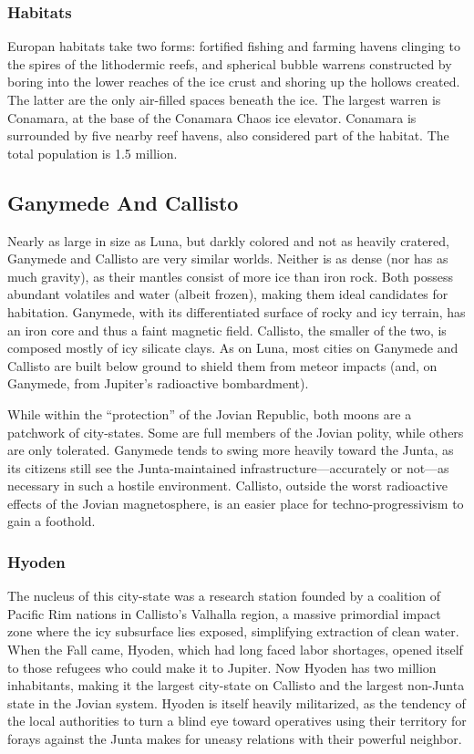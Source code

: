 \subsubsection{Habitats}

Europan habitats take two forms: fortified fishing and 
farming havens clinging to the spires of the lithodermic reefs, and spherical bubble warrens constructed 
by boring into the lower reaches of the ice crust and 
shoring up the hollows created. The latter are the only 
air-filled spaces beneath the ice. The largest warren is 
Conamara, at the base of the Conamara Chaos ice 
elevator. Conamara is surrounded by five nearby reef 
havens, also considered part of the habitat. The total 
population is 1.5 million.

\subsection{Ganymede And Callisto}

Nearly as large in size as Luna, but darkly colored 
and not as heavily cratered, Ganymede and Callisto 
are very similar worlds. Neither is as dense (nor has 
as much gravity), as their mantles consist of more ice 
than iron rock. Both possess abundant volatiles and 
water (albeit frozen), making them ideal candidates 
for habitation. Ganymede, with its differentiated surface of rocky and icy terrain, has an iron core and thus 
a faint magnetic field. Callisto, the smaller of the two, 
is composed mostly of icy silicate clays. As on Luna, 
most cities on Ganymede and Callisto are built below 
ground to shield them from meteor impacts (and, on 
Ganymede, from Jupiter's radioactive bombardment).

While within the ``protection'' of the Jovian Republic, both moons are a patchwork of city-states. 
Some are full members of the Jovian polity, while 
others are only tolerated. Ganymede tends to swing 
more heavily toward the Junta, as its citizens still 
see the Junta-maintained infrastructure—accurately 
or not—as necessary in such a hostile environment. 
Callisto, outside the worst radioactive effects of the 
Jovian magnetosphere, is an easier place for techno-progressivism to gain a foothold.

\subsubsection{Hyoden}

The nucleus of this city-state was a research station 
founded by a coalition of Pacific Rim nations in Callisto's Valhalla region, a massive primordial impact zone 
where the icy subsurface lies exposed, simplifying extraction of clean water. When the Fall came, Hyoden, 
which had long faced labor shortages, opened itself 
to those refugees who could make it to Jupiter. Now 
Hyoden has two million inhabitants, making it the 
largest city-state on Callisto and the largest non-Junta 
state in the Jovian system. Hyoden is itself heavily 
militarized, as the tendency of the local authorities to 
turn a blind eye toward operatives using their territory 
for forays against the Junta makes for uneasy relations 
with their powerful neighbor.

